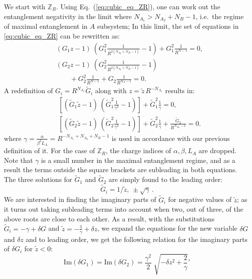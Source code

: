 \documentclass[aps,pra,reprint,superscriptaddress,twocolumn,notitlepage]{revtex4-1}
\numberwithin{equation}{section}
\begin{document}
We start with $\mathbb{Z}_R$.
Using Eq.~(\ref{eq:cubic_eq_ZR}), one can work out the entanglement negativity in the limit where $N_{A_1} > N_{A_2} + N_B - 1$, i.e.~the regime of maximal entanglement in $A$ subsystem; 
In this limit, the set of equations in \eqref{eq:cubic_eq_ZR} can be rewritten as:
\begin{equation}
\begin{aligned}
   & \left( G_1 z - 1 \right)  \  \left(  G_1^2 \frac{1}{ R^{2(N_{A_2}+N_B-1)} } -1  \right) 
    + G_1^2 \frac{1}{R^{N-1}} = 0, \\
   & \left( G_2 z - 1 \right)  \  \left(  G_2^2 \frac{1}{ R^{2(N_{A_2}+N_B-1)} } -1  \right) \\
   & \qquad + G_2^2 \frac{1}{R^{N-1}}  + G_2 \frac{1}{R^{N_A-1}}= 0.
\end{aligned}   
\end{equation}
%
A redefinition of $G_i = R^{N_{A_1}} \tilde{G}_i$ along with $z=\tilde{z} \, R^{-N_{A_1}}$ results in:
\begin{equation}
\begin{aligned}
    &\left[\left( \tilde G_1 \tilde z - 1 \right)  \  \left(  \tilde G_1^2 \frac{1}{ \gamma^2 } -1  \right) \right]
    + \tilde G_1^2 \frac{1}{\gamma} = 0, \\
    &\left[ \left( \tilde G_2 \tilde z - 1 \right)  \  \left(  \tilde G_2^2 \frac{1}{ \gamma^2 } -1  \right) \right]
    + \tilde G_2^2 \frac{1}{ \gamma }  +  \frac{\tilde G_2}{R^{N_{A_2}-1}} = 0.
\end{aligned}   
\end{equation}
where $\gamma = \frac{\alpha}{\beta^2 L_A} = R^{-N_{A_1}+N_{A_2}+N_B - 1}$ is used in accordance with our previous definition of it. For the case of $\mathbb{Z}_R$, the charge indices of $\alpha,\beta, L_{A}$ are dropped. Note that $\gamma$ is a small number in the maximal entanglement regime, and as a result the terms outside the square brackets are subleading in both equations. The three solutions for $\tilde G_1$ and $\tilde G_2$ are simply found to the leading order: 
\begin{equation}
    \tilde G_i = 1/\tilde z, \ \pm \sqrt{\gamma} \,.
\end{equation}
We are interested in finding the imaginary parts of $\tilde G_i$ for negative values of $\tilde z$; as it turns out taking subleading terms into account when two, out of three, of the above roots are close to each other. As a result, with the substitutions $\tilde G_i = -\gamma + \delta G$ and $\tilde z = -\frac1\gamma + \delta z$, we expand the equations for the new variable $\delta G$ and $\delta z$ and to leading order, we get the following relation for the imaginary parts of $\delta G_i$ for $\tilde{z}<0$:
\begin{equation}
    \mathrm{Im}(\delta G_1) = \mathrm{Im}(\delta G_2) = \frac{\gamma^2}{2} \; \sqrt{-\delta z^2 + \frac2\gamma}'
\end{equation}
\end{document}
